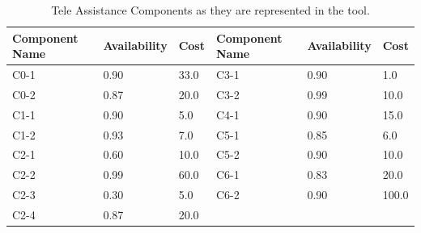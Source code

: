 \begin{table}[ht!b]
	\centering
	\begin{tabular}{|p{2cm}|p{2cm}|p{1cm}||p{2cm}|p{2cm}|p{1cm}|}
		\hline 
		\textbf{Component Name} & \textbf{Availability} & \textbf{Cost} & \textbf{Component Name} & \textbf{Availability} & \textbf{Cost} \\ 
		\hline 
		C0-1 & 0.90 & 33.0 & C3-1 & 0.90 & 1.0 \\
		\hline 
		C0-2 & 0.87 & 20.0 & C3-2 & 0.99 & 10.0 \\ 
		\hline 
		C1-1 & 0.90 & 5.0 & C4-1 & 0.90 & 15.0 \\ 
		\hline 
		C1-2 & 0.93 & 7.0 & C5-1 & 0.85 & 6.0 \\ 
		\hline
		C2-1 & 0.60 & 10.0 & C5-2 & 0.90 & 10.0 \\ 
		\hline
		C2-2 & 0.99 & 60.0 & C6-1 & 0.83 & 20.0 \\ 
		\hline
		C2-3 & 0.30 & 5.0 & C6-2 & 0.90 & 100.0 \\ 
		\hline
		C2-4 & 0.87 & 20.0 & & & \\ 
		\hline
	\end{tabular} 
	\caption[TAS Components]{Tele Assistance Components as they are represented in the tool.}
	\label{tab:ag-comp}
\end{table}

